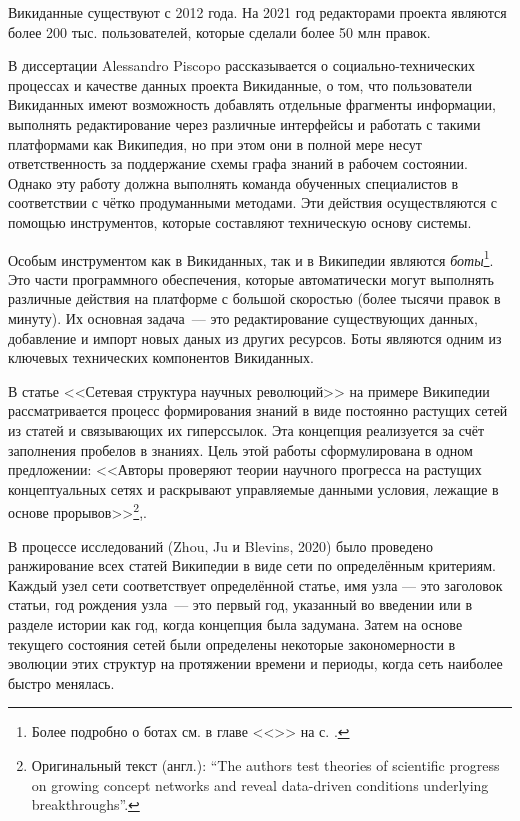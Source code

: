 Викиданные существуют с 2012 года. На 2021 год редакторами проекта являются более 200 тыс. пользователей, которые сделали более 50 млн правок.

В диссертации Alessandro Piscopo\autocite{Piscopo} рассказывается о социально-технических процессах и качестве данных проекта Викиданные, о том, что пользователи Викиданных имеют возможность добавлять отдельные фрагменты информации, выполнять редактирование через различные интерфейсы и работать с такими платформами как Википедия, но при этом они в полной мере несут ответственность за поддержание схемы графа знаний\autocite{Knowledge_Graphs} в рабочем состоянии. Однако эту работу должна выполнять команда обученных специалистов в соответствии с чётко продуманными методами. Эти действия осуществляются с помощью инструментов, которые составляют техническую основу системы.

Особым инструментом как в Викиданных, так и в Википедии являются \emph{боты}\footnote{%
%
Более подробно о ботах см. в главе <<>> на с. \pageref{ch:bots}.%
%
}. Это части программного обеспечения, которые автоматически могут выполнять различные действия на платформе с большой скоростью (более тысячи правок в минуту). Их основная задача~--- это редактирование существующих данных, добавление и импорт новых даных из других ресурсов. Боты являются одним из ключевых технических компонентов Викиданных. 

В статье <<Сетевая структура научных революций>>\autocite{Network_structure_revolutions} на примере Википедии рассматривается процесс формирования знаний в виде постоянно растущих сетей из статей и связывающих их гиперссылок. Эта концепция реализуется за счёт заполнения пробелов в знаниях. Цель этой работы сформулирована в одном предложении: <<Авторы проверяют теории научного прогресса на растущих концептуальных сетях и раскрывают управляемые данными условия, лежащие в основе прорывов>>\footnote{Оригинальный текст (англ.):  ``The authors test theories of scientific progress on growing concept networks and reveal data-driven conditions underlying breakthroughs''.},\autocite{Network_structure_revolutions}.

В процессе исследований (Zhou, Ju и Blevins, 2020)\autocite{Network_structure_revolutions}  было проведено ранжирование всех статей Википедии в виде сети по определённым критериям. Каждый узел сети соответствует определённой статье, имя узла --- это заголовок статьи, год рождения узла~--- это первый год, указанный во введении или в разделе истории как год, когда концепция была задумана. Затем на основе текущего состояния сетей были определены некоторые закономерности в эволюции этих структур на протяжении времени и периоды, когда сеть наиболее быстро менялась.

